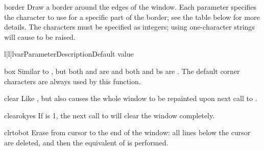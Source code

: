 \begin{methoddesc}{border}{}
Draw a border around the edges of the window. Each parameter specifies 
the character to use for a specific part of the border; see the table
below for more details.  The characters must be specified as integers;
using one-character strings will cause  to be
raised.


\begin{tableiii}{l|l|l}{var}{Parameter}{Description}{Default value}
\end{tableiii}
\end{methoddesc}

\begin{methoddesc}{box}{}
Similar to , but both  and  are
 and both  and {bs} are .  The default
corner characters are always used by this function.
\end{methoddesc}

\begin{methoddesc}{clear}{}
Like , but also causes the whole window to be repainted
upon next call to .
\end{methoddesc}

\begin{methoddesc}{clearok}{yes}
If  is 1, the next call to 
will clear the window completely.
\end{methoddesc}

\begin{methoddesc}{clrtobot}{}
Erase from cursor to the end of the window: all lines below the cursor
are deleted, and then the equivalent of  is performed.
\end{methoddesc}

